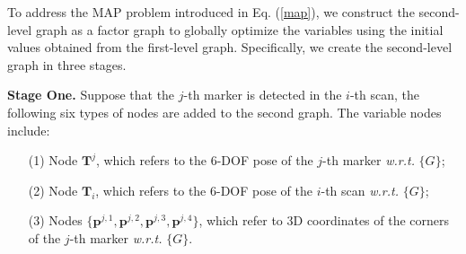 To address the MAP problem introduced in Eq. (\ref{map}), we construct the second-level graph as a factor graph to globally optimize the variables using the initial values obtained from the first-level graph. Specifically, we create the second-level graph in three stages.\par
\noindent\textbf{Stage One.} Suppose that the $j$-th marker is detected in the $i$-th scan, the following six types of nodes are added to the second graph. The variable nodes include: 
\begin{itemize}
    \item [(1)] Node $\mathbf{T}^{j}$, which refers to the 6-DOF pose of the $j$-th marker \textit{w.r.t.} $\{G\}$;
    \item [(2)] Node $\mathbf{T}_{i}$, which refers to the 6-DOF pose of the $i$-th scan \textit{w.r.t.} $\{G\}$;
    \item [(3)] Nodes $\{ \mathbf{p}^{j,1}, \mathbf{p}^{j,2}, \mathbf{p}^{j,3}, \mathbf{p}^{j,4} \}$, which refer to 3D coordinates of the corners of the $j$-th marker \textit{w.r.t.} $\{G\}$. 
\end{itemize}
